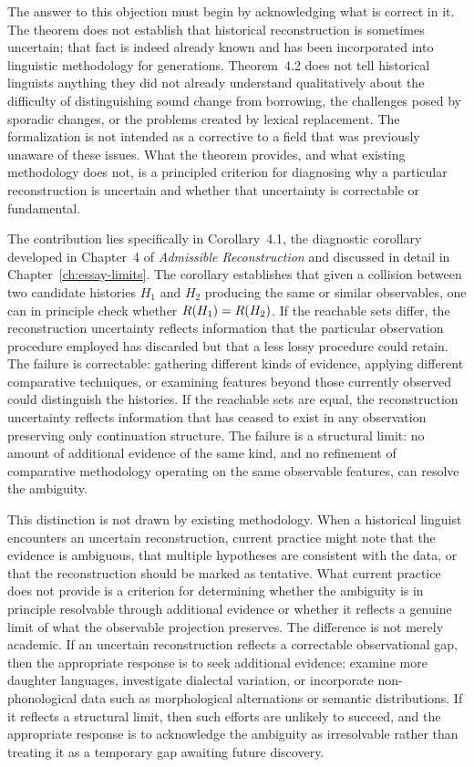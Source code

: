The answer to this objection must begin by acknowledging what is correct in it. The theorem does not establish that historical reconstruction is sometimes uncertain; that fact is indeed already known and has been incorporated into linguistic methodology for generations. Theorem~4.2 does not tell historical linguists anything they did not already understand qualitatively about the difficulty of distinguishing sound change from borrowing, the challenges posed by sporadic changes, or the problems created by lexical replacement. The formalization is not intended as a corrective to a field that was previously unaware of these issues. What the theorem provides, and what existing methodology does not, is a principled criterion for diagnosing why a particular reconstruction is uncertain and whether that uncertainty is correctable or fundamental.

The contribution lies specifically in Corollary~4.1, the diagnostic corollary developed in Chapter~4 of \emph{Admissible Reconstruction} and discussed in detail in Chapter~\ref{ch:essay-limits}. The corollary establishes that given a collision between two candidate histories $H_1$ and $H_2$ producing the same or similar observables, one can in principle check whether $R(H_1) = R(H_2)$. If the reachable sets differ, the reconstruction uncertainty reflects information that the particular observation procedure employed has discarded but that a less lossy procedure could retain. The failure is correctable: gathering different kinds of evidence, applying different comparative techniques, or examining features beyond those currently observed could distinguish the histories. If the reachable sets are equal, the reconstruction uncertainty reflects information that has ceased to exist in any observation preserving only continuation structure. The failure is a structural limit: no amount of additional evidence of the same kind, and no refinement of comparative methodology operating on the same observable features, can resolve the ambiguity.

This distinction is not drawn by existing methodology. When a historical linguist encounters an uncertain reconstruction, current practice might note that the evidence is ambiguous, that multiple hypotheses are consistent with the data, or that the reconstruction should be marked as tentative. What current practice does not provide is a criterion for determining whether the ambiguity is in principle resolvable through additional evidence or whether it reflects a genuine limit of what the observable projection preserves. The difference is not merely academic. If an uncertain reconstruction reflects a correctable observational gap, then the appropriate response is to seek additional evidence: examine more daughter languages, investigate dialectal variation, or incorporate non-phonological data such as morphological alternations or semantic distributions. If it reflects a structural limit, then such efforts are unlikely to succeed, and the appropriate response is to acknowledge the ambiguity as irresolvable rather than treating it as a temporary gap awaiting future discovery.

